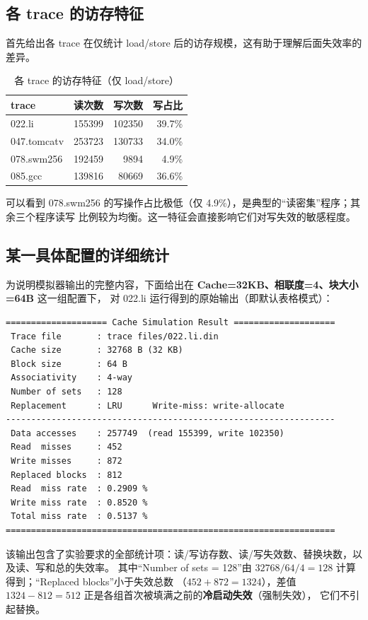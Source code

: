 \documentclass[12pt,a4paper]{ctexart}
\begin{document}
\subsection{各 trace 的访存特征}
首先给出各 trace 在仅统计 load/store 后的访存规模，这有助于理解后面失效率的差异。
\begin{table}[H]
\centering
\caption{各 trace 的访存特征（仅 load/store）}
\label{tab:profile}
\begin{tabular}{lrrr}
\toprule
trace & 读次数 & 写次数 & 写占比 \\
\midrule
022.li      & 155399 & 102350 & 39.7\% \\
047.tomcatv & 253723 & 130733 & 34.0\% \\
078.swm256  & 192459 &   9894 &  4.9\% \\
085.gcc     & 139816 &  80669 & 36.6\% \\
\bottomrule
\end{tabular}
\end{table}
可以看到 078.swm256 的写操作占比极低（仅 4.9\%），是典型的“读密集”程序；其余三个程序读写
比例较为均衡。这一特征会直接影响它们对写失效的敏感程度。

\subsection{某一具体配置的详细统计}
为说明模拟器输出的完整内容，下面给出在 \textbf{Cache=32KB、相联度=4、块大小=64B} 这一组配置下，
对 022.li 运行得到的原始输出（即默认表格模式）：
\begin{lstlisting}
==================== Cache Simulation Result ====================
 Trace file       : trace files/022.li.din
 Cache size       : 32768 B (32 KB)
 Block size       : 64 B
 Associativity    : 4-way
 Number of sets   : 128
 Replacement      : LRU      Write-miss: write-allocate
-----------------------------------------------------------------
 Data accesses    : 257749  (read 155399, write 102350)
 Read  misses     : 452
 Write misses     : 872
 Replaced blocks  : 812
 Read  miss rate  : 0.2909 %
 Write miss rate  : 0.8520 %
 Total miss rate  : 0.5137 %
=================================================================
\end{lstlisting}
该输出包含了实验要求的全部统计项：读/写访存数、读/写失效数、替换块数，以及读、写和总的失效率。
其中“Number of sets = 128”由 $32768 / 64 / 4 = 128$ 计算得到；“Replaced blocks”小于失效总数
（$452+872=1324$），差值 $1324-812=512$ 正是各组首次被填满之前的\textbf{冷启动失效}（强制失效），
它们不引起替换。
\end{document}

